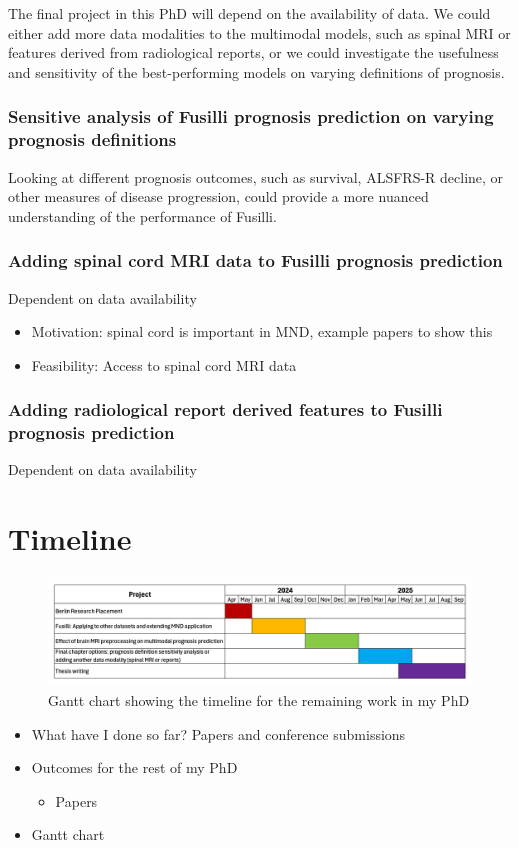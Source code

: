 
The final project in this PhD will depend on the availability of data.
We could either add more data modalities to the multimodal models, such as spinal MRI or features derived from radiological reports, or we could investigate the usefulness and sensitivity of the best-performing models on varying definitions of prognosis.

\subsubsection*{Sensitive analysis of Fusilli prognosis prediction on varying prognosis definitions}

Looking at different prognosis outcomes, such as survival, ALSFRS-R decline, or other measures of disease progression, could provide a more nuanced understanding of the performance of Fusilli.

\subsubsection*{Adding spinal cord MRI data to Fusilli prognosis prediction}
Dependent on data availability
\begin{itemize}
    \item Motivation: spinal cord is important in MND, example papers to show this
    \item Feasibility: Access to spinal cord MRI data
\end{itemize}

\subsubsection{Adding radiological report derived features to Fusilli prognosis prediction}
Dependent on data availability
\section{Timeline}

\begin{figure}
    \centering
    \hspace*{-0.1\textwidth}
    \includegraphics[width=1.2\textwidth]{figures/gantt_chart}
    \caption{Gantt chart showing the timeline for the remaining work in my PhD}
    \label{fig:gantt_chart}
\end{figure}

\begin{itemize}
    \item What have I done so far? Papers and conference submissions
    \item Outcomes for the rest of my PhD
    \begin{itemize}
        \item Papers
    \end{itemize}
    \item Gantt chart
\end{itemize}
